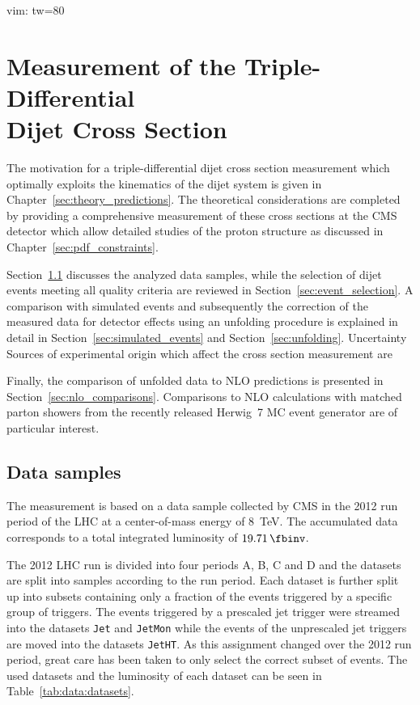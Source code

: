  vim: tw=80

\chapter[Measurement of the Triple-Differential Dijet Cross Section]{Measurement
of the Triple-Differential\\ Dijet Cross Section}
\label{sec:measurement}

The motivation for a triple-differential dijet cross section measurement which
optimally exploits the kinematics of the dijet system is given in
Chapter~\ref{sec:theory_predictions}. The theoretical considerations are completed
by providing a comprehensive measurement of these cross sections at the CMS
detector which allow detailed studies of the proton structure as discussed in
Chapter~\ref{sec:pdf_constraints}. 

Section~\ref{sec:datasets} discusses the
analyzed data samples, while the selection of dijet events meeting all quality
criteria are reviewed in Section~\ref{sec:event_selection}. A comparison with
simulated events and subsequently the correction of the measured data for
detector effects using an unfolding procedure is explained in detail in
Section~\ref{sec:simulated_events} and Section~\ref{sec:unfolding}. Uncertainty
Sources of experimental origin which affect the cross section measurement are

Finally, the comparison of unfolded data to NLO predictions is presented in
Section~\ref{sec:nlo_comparisons}. Comparisons to NLO calculations with matched
parton showers from the recently released Herwig~7 MC event generator are of
particular interest.

\section{Data samples}
\label{sec:datasets}

The measurement is based on a data sample collected by CMS in the 2012 run
period of the LHC at a center-of-mass energy of \SI{8}{\TeV}. The accumulated
data corresponds to a total integrated luminosity of $\SI{19.71}{\fbinv}$. 

The 2012 LHC run is divided into four periods A, B, C and D and the datasets are
split into samples according to the run period. Each dataset is further split up
into subsets containing only a fraction of the events triggered by a specific
group of triggers. The events triggered by a prescaled jet trigger were streamed
into the datasets \texttt{Jet} and \texttt{JetMon} while the events of the
unprescaled jet triggers are moved into the datasets \texttt{JetHT}. As this
assignment changed over the 2012 run period, great care has been taken to only
select the correct subset of events. The used datasets and the luminosity of
each dataset can be seen in Table~\ref{tab:data:datasets}.

